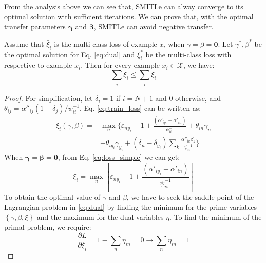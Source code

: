 From the analysis above we can see that, SMITLe can alway converge to its optimal solution with sufficient iterations. We can prove that, with the optimal transfer parameters $\boldsymbol{\gamma}$ and $\boldsymbol{\beta}$, SMITLe can avoid negative transfer.
\begin{theorem}\label{th:1}
Assume that $\bar \xi_i$ is the multi-class loss of example $x_i$ when $\gamma=\beta = \mathbf{0}$. Let $\gamma^*, \beta^*$ be the optimal solution for Eq. \eqref{eq:dual} and $\xi_i^*$ be the multi-class loss with respective to example $x_i$. Then for every example $x_i \in \mathcal{X}$, we have:\[\sum\limits_i {{\xi _i}}  \le \sum\limits_i {{{\bar \xi }_i}} \]
\end{theorem}
\begin{proof}
For simplification, let $\delta_i=1$ if $i=N+1$ and 0 otherwise, and  ${\theta _{ij}} = {\alpha ''_{ij}}\left( {1 - {\delta _j}} \right)/\psi_{ii}^{ - 1}$. Eq. \eqref{eq:train_loss} can be written as:
\begin{equation}\label{eq:loss_simple}
\begin{split}
{\xi _i}(\gamma ,\beta )=&\mathop {\max }\limits_{n} \bigg \{ {\varepsilon _{n{y_i}}} - 1 + \frac{{\left( {{{\alpha '}_{i{y_i}}} - {{\alpha '}_{in}}} \right)}}{{\psi _{ii}^{ - 1}}} + {\theta _{in}}{\gamma _n} \\
&- {\theta _{i{y_i}}}{\gamma _{{y_i}}} + \left( {{\delta _n} - {\delta _{{y_i}}}} \right)\sum\limits_k {\frac{{{{\alpha ''}_{ik}}{\beta _k}}}{{\psi_{ii}^{ - 1}}}}  \bigg\}
\end{split}
\end{equation}
When $\mathbf{\gamma}=\mathbf{\beta} = \mathbf{0}$, from Eq. \eqref{eq:loss_simple} we can get:
\begin{equation*}
{\bar \xi _i} = \mathop {\max }\limits_n \left[ { {\varepsilon _{n{y_i}}}-1 + \frac{{\left( {{{\alpha '}_{i{y_i}}} - {{\alpha '}_{in}}} \right)}}{{\psi _{ii}^{ - 1}}}} \right]
\end{equation*}
To obtain the optimal value of $\gamma$ and $\beta$, we have to seek the saddle point of the Lagrangian problem in \eqref{eq:dual} by finding the minimum for the prime variables $\left\{ \gamma, \beta, \xi \right\}$ and the maximum for the dual variables $\eta $. To find the minimum of the primal problem, we require:
\begin{equation*}
\frac{{\partial L}}{{\partial {\xi _i}}} = 1 - \sum\limits_n {{\eta _{in}}}  = 0 \to \sum\limits_n {{\eta _{in}}}  = 1
\end{equation*}   

\end{proof}
